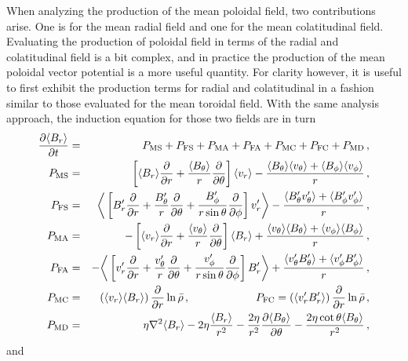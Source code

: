 When analyzing the production of the mean poloidal field, two
contributions arise.  One is for the mean radial field and one for the
mean colatitudinal field.  Evaluating the production of poloidal field
in terms of the radial and colatitudinal field is a bit complex, and
in practice the production of the mean poloidal vector potential is a
more useful quantity.  For clarity however, it is useful to first exhibit
the production terms for radial and colatitudinal in a fashion similar to 
those evaluated for the mean toroidal field.  With the same analysis approach,
the induction equation for those two fields are in turn
\begin{eqnarray}
\frac{\partial \langle B_{r} \rangle }{\partial t} &=&
             P_\mathrm{MS} + P_\mathrm{FS}  
	   + P_\mathrm{MA} + P_\mathrm{FA} 
	   + P_\mathrm{MC} + P_\mathrm{FC}
	   + P_\mathrm{MD} \nonumber\thinspace,\\
P_\mathrm{MS} &=& \phn\advbm  \langle v_r \rangle  - \frac{ \langle B_{\theta} \rangle  \langle v_{\theta} \rangle + \langle B_{\phi} \rangle  \langle v_{\phi} \rangle }{r}\thinspace,\\
P_\mathrm{FS} &=& \phn\bigg\langle \advbf v_r' \bigg\rangle  - \frac{ \langle B_{\theta}'v_{\theta}' \rangle + \langle B_{\phi}'v_{\phi}' \rangle }{r}\thinspace,\\
P_\mathrm{MA} &=&-\advvm  \langle B_r \rangle  + \frac{ \langle v_{\theta} \rangle  \langle B_{\theta} \rangle + \langle v_{\phi} \rangle  \langle B_{\phi} \rangle }{r}\thinspace,\\
P_\mathrm{FA} &=&-\bigg\langle \advvf B_r' \bigg\rangle  + \frac{ \langle v_{\theta}'B_{\theta}' \rangle + \langle v_{\phi}'B_{\phi}' \rangle }{r}\thinspace,\\
P_\mathrm{MC} &=& \phn\left( \langle v_r \rangle  \langle B_r \rangle
             \right)\frac{\p}{\p r}\ln \rb\thinspace, \qquad\qquad \qquad %
P_\mathrm{FC} = \left( \langle v_r'B_r' \rangle \right)\frac{\p}{\p r}\ln \rb\thinspace,\\
P_\mathrm{MD} &=& \phn\eta\nabla^{2} \langle B_r \rangle 
                - 2\eta\frac{ \langle B_r \rangle }{r^2}
		- \frac{2\eta}{r^2}\frac{\p \langle B_{\theta} \rangle }{\p \theta}
                - \frac{2\eta \cot\theta \langle B_{\theta} \rangle }{r^2}\thinspace,
\end{eqnarray}
and
